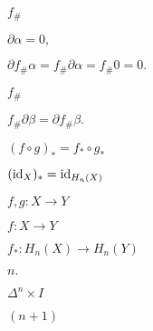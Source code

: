 \documentclass[10pt]{book}
\begin{document}
\begin{mdSnippets}
\begin{mdInlineSnippet}
$f_\#$\end{mdInlineSnippet}%
\begin{mdInlineSnippet}%
$\partial\alpha = 0,$\end{mdInlineSnippet}%
\begin{mdInlineSnippet}[bfb0ce92b61b7ce4639504a3ae6a6cc7]%
$\partial f_\# \alpha = f_\# \partial \alpha = f_\# 0 = 0.$\end{mdInlineSnippet}%
\begin{mdInlineSnippet}%
$f_\#$\end{mdInlineSnippet}%
\begin{mdInlineSnippet}[19dacf6cb841d0e3150bd5a1f1c10a7e]%
$f_\#\partial\beta = \partial f_\# \beta.$\end{mdInlineSnippet}%
\begin{mdInlineSnippet}%
$(f \circ g)_* = f_* \circ g_*$\end{mdInlineSnippet}%
\begin{mdInlineSnippet}[b656b00f1513c61012d1e697010ebfa1]%
$(\operatorname{id}_X)_* = \operatorname{id}_{H_n(X)}$\end{mdInlineSnippet}%
\begin{mdInlineSnippet}%
$f,g: X \to Y$\end{mdInlineSnippet}%
\begin{mdInlineSnippet}[2385fde6b300ad088e0c2711c9da8a74]%
$f: X \to Y$\end{mdInlineSnippet}%
\begin{mdInlineSnippet}[45b902cf2d786590c22172c023684053]%
$f_*: H_n(X) \to H_n(Y)$\end{mdInlineSnippet}%
\begin{mdInlineSnippet}[36cb6ed5283e452800c275dd6934aecc]%
$n.$\end{mdInlineSnippet}%
\begin{mdInlineSnippet}[1341e2772acf002a68e1fb9de246aa3d]%
$\Delta^n \times I$\end{mdInlineSnippet}%
\begin{mdInlineSnippet}%
$(n+1)$\end{mdInlineSnippet}%

\end{mdSnippets}
\end{document}
